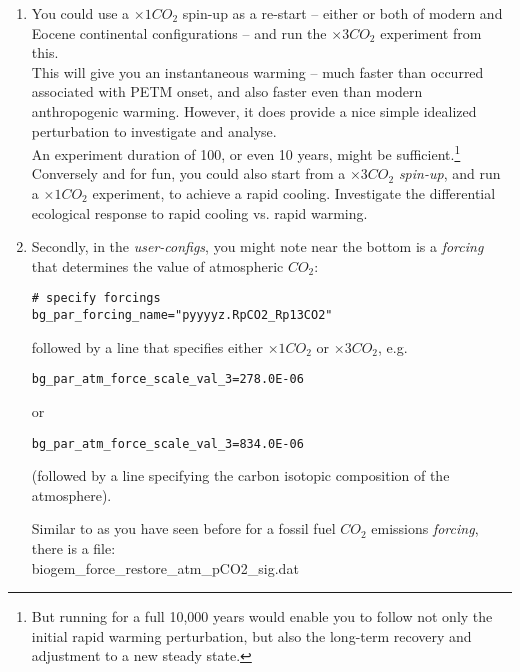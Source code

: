 \documentclass[11pt,fleqn]{book} %
\begin{document}
\begin{enumerate}[noitemsep]

\vspace{1mm}
\item You could use a \(\times1 CO_{2}\) spin-up as a re-start -- either or both of modern and Eocene continental configurations -- and run the \(\times3 CO_{2}\) experiment from this.
\\This will give you an instantaneous warming -- much faster than occurred associated with PETM onset, and also faster even than modern anthropogenic warming. However, it does provide a nice simple idealized perturbation to investigate and analyse.
\\An experiment duration of 100, or even 10 years, might be sufficient.\footnote{But running for a full 10,000 years would enable you to follow not only the initial rapid warming perturbation, but also the long-term recovery and adjustment to a new steady state.}
\\Conversely and for fun, you could also start from a \(\times3 CO_{2}\) \textit{spin-up}, and run a \(\times1 CO_{2}\) experiment, to achieve a rapid cooling. Investigate the differential ecological response to rapid cooling vs. rapid warming.

\vspace{1mm}
\item Secondly, in the \textit{user-configs}, you might note near the bottom is a \textit{forcing} that determines the value of atmospheric \(CO_{2}\):
\vspace{-2mm}\begin{verbatim}
# specify forcings
bg_par_forcing_name="pyyyyz.RpCO2_Rp13CO2"
\end{verbatim}\vspace{-2mm}
followed by a line that specifies either \(\times1 CO_{2}\) or \(\times3 CO_{2}\), e.g.
\vspace{-2mm}\begin{verbatim}
bg_par_atm_force_scale_val_3=278.0E-06
\end{verbatim}\vspace{-2mm}
or
\vspace{-2mm}\begin{verbatim}
bg_par_atm_force_scale_val_3=834.0E-06
\end{verbatim}\vspace{-2mm}
(followed by a line specifying the carbon isotopic composition of the atmosphere).

Similar to as you have seen before for a fossil fuel \(CO_{2}\) emissions \textit{forcing}, there is a file:
\vspace{1mm}
\\ \indent \textsf{\footnotesize biogem\_force\_restore\_atm\_pCO2\_sig.dat}
\vspace{1mm}


\end{enumerate}
\end{document}
